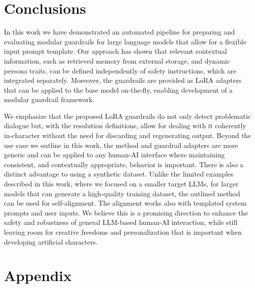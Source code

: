 \documentclass[letterpaper]{article}
\begin{document}
\section{Conclusions}
In this work we have demonstrated an automated pipeline for preparing and evaluating modular guardrails for large language models that allow for a flexible input prompt template. Our approach has shown that relevant contextual information, such as retrieved memory from external storage, and dynamic persona traits, can be defined independently of safety instructions, which are integrated separately.
Moreover, the guardrails are provided as LoRA adapters that can be applied to the base model on-the-fly, enabling development of a modular guardrail framework.

We emphasize that the proposed LoRA guardrails do not only detect problematic dialogue but, with the resolution definitions, allow for dealing with it coherently in-character without the need for discarding and regenerating output.
Beyond the use case we outline in this work, the method and guardrail adapters are more generic and can be applied to any human-AI interface where maintaining consistent, and contextually appropriate, behavior is important.  
There is also a distinct advantage to using a synthetic dataset. Unlike the limited examples described in this work, where we focused on a smaller target LLMs, for larger models that can generate a high-quality training dataset, the outlined method can be used for self-alignment. 
The alignment works also with templated system prompts and user inputs. We believe this is a promising direction to enhance the safety and robustness of general LLM-based human-AI interaction, while still leaving room for creative freedoms and personalization that is important when developing artificial characters. 
\footnotesize



\onecolumn

\appendix
\section{Appendix}
\label{app:appendix}
\end{document}
